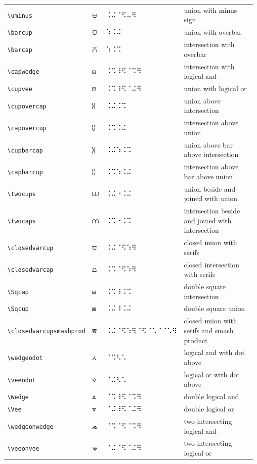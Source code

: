 \documentclass[oneside]{article}
\begin{document}
\begin{longtable}{llll}
\verb|\uminus| & $\uminus$ &  ⠨⠬⠈⠫⠤⠻  & {union with minus sign} \\[2ex]
\verb|\barcup| & $\barcup$ &  ⠱⠨⠬  & {union with overbar} \\[2ex]
\verb|\barcap| & $\barcap$ &  ⠱⠨⠩  & {intersection with overbar} \\[2ex]
\verb|\capwedge| & $\capwedge$ &  ⠨⠩⠸⠫⠈⠩⠻  & {intersection with logical and} \\[2ex]
\verb|\cupvee| & $\cupvee$ &  ⠨⠩⠸⠫⠈⠬⠻  & {union with logical or} \\[2ex]
\verb|\cupovercap| & $\cupovercap$ &  ⠨⠬⠨⠩  & {union above intersection} \\[2ex]
\verb|\capovercup| & $\capovercup$ &  ⠨⠩⠨⠬  & {intersection above union} \\[2ex]
\verb|\cupbarcap| & $\cupbarcap$ &  ⠨⠬⠱⠨⠩  & {union above bar above intersection} \\[2ex]
\verb|\capbarcup| & $\capbarcup$ &  ⠨⠩⠱⠨⠬  & {intersection above bar above union} \\[2ex]
\verb|\twocups| & $\twocups$ &  ⠨⠬⠐⠨⠬  & {union beside and joined with union} \\[2ex]
\verb|\twocaps| & $\twocaps$ &  ⠨⠩⠐⠨⠩  & {intersection beside and joined with intersection} \\[2ex]
\verb|\closedvarcup| & $\closedvarcup$ &  ⠨⠬⠈⠫⠱⠻  & {closed union with serifs} \\[2ex]
\verb|\closedvarcap| & $\closedvarcap$ &  ⠨⠩⠈⠫⠱⠻  & {closed intersection with serifs} \\[2ex]
\verb|\Sqcap| & $\Sqcap$ &  ⠨⠩⠸⠨⠩  & {double square intersection} \\[2ex]
\verb|\Sqcup| & $\Sqcup$ &  ⠨⠬⠸⠨⠬  & {double square union} \\[2ex]
\verb|\closedvarcupsmashprod| & $\closedvarcupsmashprod$ &  ⠨⠬⠈⠫⠱⠻⠈⠫⠈⠡⠈⠈⠡⠻  & {closed union with serifs and smash product} \\[2ex]
\verb|\wedgeodot| & $\wedgeodot$ &  ⠈⠩⠣⠡  & {logical and with dot above} \\[2ex]
\verb|\veeodot| & $\veeodot$ &  ⠈⠬⠣⠡  & {logical or with dot above} \\[2ex]
\verb|\Wedge| & $\Wedge$ &  ⠈⠩⠸⠫⠈⠩⠻  & {double logical and} \\[2ex]
\verb|\Vee| & $\Vee$ &  ⠈⠬⠸⠫⠈⠬⠻  & {double logical or} \\[2ex]
\verb|\wedgeonwedge| & $\wedgeonwedge$ &  ⠈⠩⠈⠫⠈⠩⠻  & {two intersecting logical and} \\[2ex]
\verb|\veeonvee| & $\veeonvee$ &  ⠈⠬⠈⠫⠈⠬⠻  & {two intersecting logical or} \\[2ex]

\end{longtable}
\end{document}
